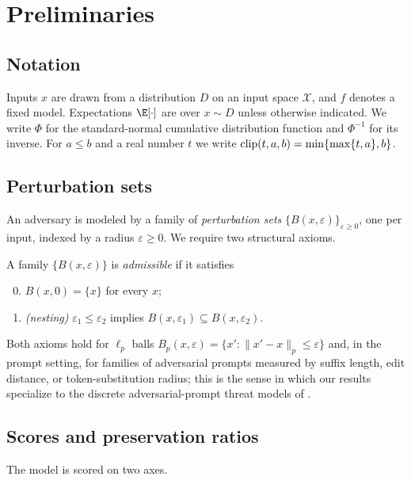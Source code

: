 \section{Preliminaries}
\label{sec:prelim}

\subsection{Notation}
Inputs $x$ are drawn from a distribution $D$ on an input space $\mathcal{X}$, and
$f$ denotes a fixed model. Expectations $\E[\cdot]$ are over $x\sim D$ unless
otherwise indicated. We write $\Phi$ for the standard-normal cumulative
distribution function and $\Phi^{-1}$ for its inverse. For $a\le b$ and a real
number $t$ we write $\mathrm{clip}(t,a,b)=\min\{\max\{t,a\},b\}$.

\subsection{Perturbation sets}
An adversary is modeled by a family of \emph{perturbation sets}
$\{B(x,\varepsilon)\}_{\varepsilon\ge0}$, one per input, indexed by a radius
$\varepsilon\ge0$. We require two structural axioms.

\begin{definition}\label{def:pert}
A family $\{B(x,\varepsilon)\}$ is \emph{admissible} if it satisfies
\begin{enumerate}[label=\textup{(P\arabic*)},leftmargin=*]
  \setcounter{enumi}{-1}
  \item \label{P0} $B(x,0)=\{x\}$ for every $x$;
  \item \label{P1} \emph{(nesting)} $\varepsilon_1\le\varepsilon_2$ implies
  $B(x,\varepsilon_1)\subseteq B(x,\varepsilon_2)$.
\end{enumerate}
\end{definition}

Both axioms hold for $\ell_p$ balls $B_p(x,\varepsilon)=\{x':\|x'-x\|_p\le
\varepsilon\}$ and, in the prompt setting, for families of adversarial prompts
measured by suffix length, edit distance, or token-substitution radius; this is the
sense in which our results specialize to the discrete adversarial-prompt threat
models of \cite{Zou2023,Chao2024}.

\subsection{Scores and preservation ratios}
The model is scored on two axes.

